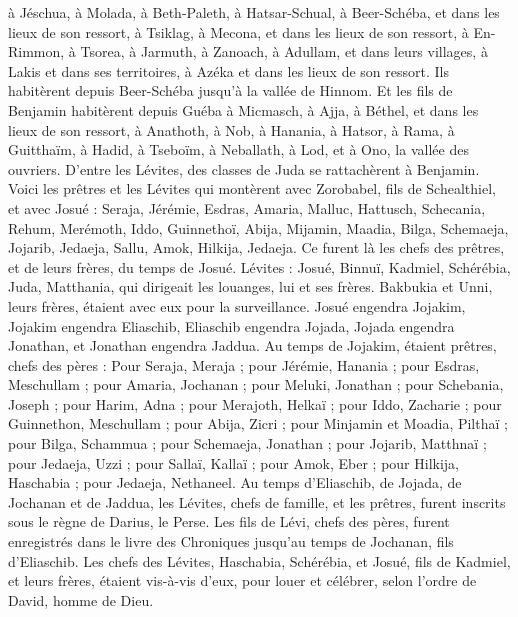 \begin{multicols}{2}
à Jéschua, à Molada, à Beth-Paleth,
à Hatsar-Schual, à Beer-Schéba, et dans les lieux de son ressort,
à Tsiklag, à Mecona, et dans les lieux de son ressort,
à En-Rimmon, à Tsorea, à Jarmuth,
à Zanoach, à Adullam, et dans leurs villages, à Lakis et dans ses territoires, à Azéka et dans les lieux de son ressort. Ils habitèrent depuis Beer-Schéba jusqu'à la vallée de Hinnom.
Et les fils de Benjamin habitèrent depuis Guéba à Micmasch, à Ajja, à Béthel, et dans les lieux de son ressort,
à Anathoth, à Nob, à Hanania,
à Hatsor, à Rama, à Guitthaïm,
à Hadid, à Tseboïm, à Neballath,
à Lod, et à Ono, la vallée des ouvriers.
D'entre les Lévites, des classes de Juda se rattachèrent à Benjamin.
\VerseOne{}Voici les prêtres et les Lévites qui montèrent avec Zorobabel, fils de Schealthiel, et avec Josué : Seraja, Jérémie, Esdras,
Amaria, Malluc, Hattusch,
Schecania, Rehum, Merémoth,
Iddo, Guinnethoï, Abija,
Mijamin, Maadia, Bilga,
Schemaeja, Jojarib, Jedaeja,
Sallu, Amok, Hilkija, Jedaeja. Ce furent là les chefs des prêtres, et de leurs frères, du temps de Josué.
Lévites : Josué, Binnuï, Kadmiel, Schérébia, Juda, Matthania, qui dirigeait les louanges, lui et ses frères.
Bakbukia et Unni, leurs frères, étaient avec eux pour la surveillance.
Josué engendra Jojakim, Jojakim engendra Eliaschib, Eliaschib engendra Jojada,
Jojada engendra Jonathan, et Jonathan engendra Jaddua.
Au temps de Jojakim, étaient prêtres, chefs des pères : Pour Seraja, Meraja ; pour Jérémie, Hanania ;
pour Esdras, Meschullam ; pour Amaria, Jochanan ;
pour Meluki, Jonathan ; pour Schebania, Joseph ;
pour Harim, Adna ; pour Merajoth, Helkaï ;
pour Iddo, Zacharie ; pour Guinnethon, Meschullam ;
pour Abija, Zicri ; pour Minjamin et Moadia, Pilthaï ;
pour Bilga, Schammua ; pour Schemaeja, Jonathan ;
pour Jojarib, Matthnaï ; pour Jedaeja, Uzzi ;
pour Sallaï, Kallaï ; pour Amok, Eber ;
pour Hilkija, Haschabia ; pour Jedaeja, Nethaneel.
Au temps d'Eliaschib, de Jojada, de Jochanan et de Jaddua, les Lévites, chefs de famille, et les prêtres, furent inscrits sous le règne de Darius, le Perse.
Les fils de Lévi, chefs des pères, furent enregistrés dans le livre des Chroniques jusqu'au temps de Jochanan, fils d'Eliaschib.
Les chefs des Lévites, Haschabia, Schérébia, et Josué, fils de Kadmiel, et leurs frères, étaient vis-à-vis d'eux, pour louer et célébrer, selon l'ordre de David, homme de Dieu.

\end{multicols}
